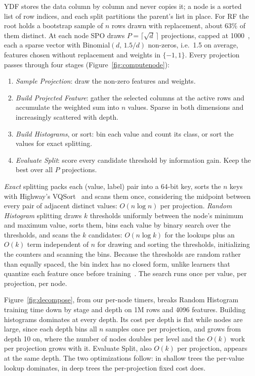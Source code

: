 \documentclass[sigconf]{acmart}%
\begin{document}
YDF stores the data column by column and never copies it; a node is a sorted list of row indices, and each split partitions the parent's list in place. For RF the root holds a bootstrap sample of $n$ rows drawn with replacement, about 63\% of them distinct. At each node SPO draws $P=\lceil\sqrt{d}\,\rceil$ projections, capped at 1000~\cite{tomita2020sparse}, each a sparse vector with Binomial$(d,\,1.5/d)$ non-zeros, i.e.\ 1.5 on average, features chosen without replacement and weights in $\{-1,1\}$. Every projection passes through four stages (Figure~\ref{fig:computenode}):
\begin{enumerate}
\item \emph{Sample Projection}: draw the non-zero features and weights.
\item \emph{Build Projected Feature}: gather the selected columns at the active rows and accumulate the weighted sum into $n$ values. Sparse in both dimensions and increasingly scattered with depth.
\item \emph{Build Histograms}, or sort: bin each value and count its class, or sort the values for exact splitting.
\item \emph{Evaluate Split}: score every candidate threshold by information gain. Keep the best over all $P$ projections.
\end{enumerate}

\emph{Exact} splitting packs each (value, label) pair into a 64-bit key, sorts the $n$ keys with Highway's VQSort~\cite{wassenberg_vectorized_2022} and scans them once, considering the midpoint between every pair of adjacent distinct values: $O(n\log n)$ per projection. \emph{Random Histogram} splitting draws $k$ thresholds uniformly between the node's minimum and maximum value, sorts them, bins each value by binary search over the thresholds, and scans the $k$ candidates: $O(n\log k)$ for the lookups plus an $O(k)$ term independent of $n$ for drawing and sorting the thresholds, initializing the counters and scanning the bins. Because the thresholds are random rather than equally spaced, the bin index has no closed form, unlike learners that quantize each feature once before training~\cite{ke2017lightgbm,prokhorenkova2018catboost}. The search runs once per value, per projection, per node.

Figure~\ref{fig:decompose}, from our per-node timers, breaks Random Histogram training time down by stage and depth on 1M rows and 4096 features. %
Building histograms dominates at every depth. Its cost per depth is flat while nodes are large, since each depth bins all $n$ samples once per projection, and grows from depth 10 on, where the number of nodes doubles per level and the $O(k)$ work per projection grows with it. Evaluate Split, also $O(k)$ per projection, appears at the same depth. The two optimizations follow: in shallow trees the per-value lookup dominates, in deep trees the per-projection fixed cost does.
\end{document}
